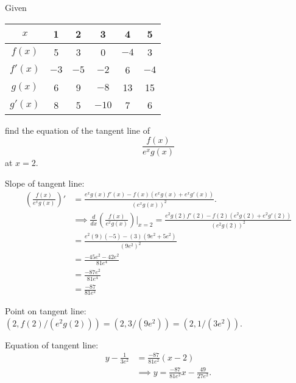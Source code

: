 \documentclass[nooutcomes]{ximera}
\renewenvironment{freeResponse}{
\ifhandout\setbox0\vbox\bgroup\else
\begin{trivlist}\item[\hskip \labelsep\bfseries Solution:\hspace{2ex}]
\fi}
{\ifhandout\egroup\else
\end{trivlist}
\fi}
\begin{document}
\begin{problem}
\begin{itemize}
    \item[(c)]
      Given
      \begin{center}
        \begin{tabular}{cccccc}
          \toprule
          $x$ & 1 & 2 & 3 & 4 & 5\\
          \midrule
          $f(x)$ & 5 & 3 & 0 &$-4$ & 3\\
          $f'(x)$ & $-3$ & $-5$ & $-2$ & 6& $-4$\\
          $g(x)$ & 6 &9&$-8$&13&15\\
          $g'(x)$ & 8 & 5 & $-10$ &7& 6\\
          \bottomrule
        \end{tabular}
      \end{center}
      find the equation of the tangent line of 
      \[
        \frac{f(x)}{e^xg(x)}
      \]
      at $x = 2$.
      \begin{freeResponse}
        Slope of tangent line:
        \begin{align*}
          \left( \frac{f(x)}{e^x g(x)} \right)'
          &= \frac{e^x g(x) f'(x) - f(x)(e^x g(x) + e^x g'(x))}{(e^x g(x))^2}.  \\
          &\implies \frac{d}{dx}\left(\frac{f(x)}{e^x g(x)}\right) \bigg|_{x=2}
          = \frac{e^2 g(2) f'(2) - f(2)(e^2 g(2) + e^2 g'(2))}{(e^2 g(2))^2}  \\
		&= \frac{e^2 (9)(-5) - (3)(9e^2 + 5e^2)}{(9e^2)^2}  \\
		&= \frac{-45e^2 -42e^2}{81e^4}  \\
		&= \frac{-87e^2}{81e^4}\\
                  &= \frac{-87}{81e^2}
        \end{align*}

        Point on tangent line: $(2, f(2)/(e^2g(2))) = (2, 3/(9e^2)) = (2, 1/(3e^2))$.

        Equation of tangent line:
        \begin{align*}
          y - \frac{1}{3e^2} &= \frac{-87}{81e^2}(x - 2)\\
                             &\implies y = \frac{-87}{81e^2}x  - \frac{49}{27e^2}.
        \end{align*}
      \end{freeResponse}
   \end{itemize}
\end{problem}
\end{document}
